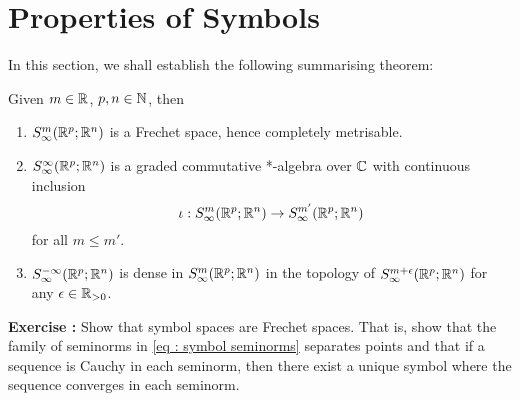 \documentclass{article}
\begin{document}
\pagebreak
\section{Properties of Symbols}
In this section, we shall establish the following summarising theorem: 

\begin{ftheorem}[Summary]
    Given $m \in {\ensuremath {\mathbb R}}$, $p, n \in {\ensuremath {\mathbb N}}$, then
    \begin{enumerate}
        \item $S^{m}_\infty({\mathbb R}^{p}; {\mathbb R}^n)$ is a Frechet space, hence completely metrisable. 
        \item $S^{\infty}_\infty({\mathbb R}^{p}; {\mathbb R}^n)$ is a graded commutative *-algebra over ${\mathbb C}$ with continuous  inclusion  $$\iota : S^{m}_\infty({\mathbb R}^p; {\mathbb R}^n) \to S^{m'}_\infty({\mathbb R}^p; {\mathbb R}^n)$$ for all $m \leq m'$. 
        \item $S^{-\infty}_\infty({\mathbb R}^{p}; {\mathbb R}^n)$ is dense in $S^{m}_\infty({\mathbb R}^{p}; {\mathbb R}^n)$ in the topology of $S^{m + \epsilon}_\infty({\mathbb R}^{p}; {\mathbb R}^n)$ for any $\epsilon \in {\ensuremath {\mathbb R}}_{> 0}$. 
    \end{enumerate}

\end{ftheorem}

\begin{mdframed}
    \textbf{Exercise : } Show that symbol spaces are Frechet spaces. That is, show that the family of seminorms in \ref{eq : symbol seminorms} separates points and that if a sequence is Cauchy in each seminorm, then there exist a unique symbol where the sequence converges in each seminorm. 
\end{mdframed}
\end{document}
